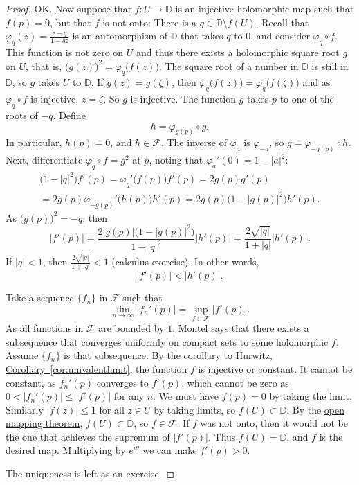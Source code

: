 \documentclass[12pt,openany]{book}
\newcommand{\sabs}[1]{\lvert {#1} \rvert}
\newcommand{\D}{{\mathbb{D}}}
\newcommand{\sF}{{\mathscr{F}}}
\theoremstyle{plain}
\theoremstyle{remark}
\theoremstyle{definition}
\theoremstyle{exercise}
\theoremstyle{example}
\newcommand{\corref}[1]{\hyperref[#1]{Corollary~\ref*{#1}}}
\begin{document}
\begin{proof}
OK\@.  Now suppose that $f \colon U \to \D$ is an injective holomorphic map
such that $f(p) = 0$, but that $f$ is not onto: There is a
$q \in \D \setminus f(U)$.
Recall that
$\varphi_q(z) = \frac{z-q}{1-\bar{q}z}$ is an automorphism of $\D$ that
takes $q$ to $0$, and consider $\varphi_q \circ f$.  This function is not
zero on $U$ and thus
there exists a holomorphic square root $g$ on $U$, that is,
${\bigl(g(z)\bigr)}^2 = \varphi_q\bigl(f(z)\bigr)$.
The square root of a number in $\D$ is still in $\D$, so $g$
takes $U$ to $\D$.
If $g(z)=g(\zeta)$, then $\varphi_q\bigl(f(z)\bigr)=\varphi_q\bigl(f(\zeta)\bigr)$ and as
$\varphi_q \circ f$ is injective, $z=\zeta$.  So $g$ is injective.  
The function $g$ takes $p$ to one of the roots of $-q$.
Define
\begin{equation*}
h = \varphi_{g(p)} \circ g .
\end{equation*}
In particular, $h(p) = 0$, and $h \in \sF$.
The inverse of $\varphi_a$ is $\varphi_{-a}$, so
$g = \varphi_{-g(p)} \circ h$.
Next, differentiate
$\varphi_q \circ f = g^2$ at $p$, noting that
$\varphi_a'(0) = 1-\sabs{a}^2$:
\begin{multline*}
\bigl(1-\sabs{q}^2\bigr) f'(p)
= \varphi_q'\bigl(f(p)\bigr) f'(p)
= 2 g(p) g'(p)
\\
= 2 g(p) \varphi_{-g(p)}'\bigl(h(p)\bigr) h'(p)
= 2 g(p) \bigl(1-\sabs{g(p)}^2\bigr) h'(p) .
\end{multline*}
As ${\bigl(g(p)\bigr)}^2 = -q$, then
\begin{equation*}
\sabs{f'(p)} =
\frac{2 \sabs{g(p)} \bigl(1-\sabs{g(p)}^2\bigr)}{1-\sabs{q}^2} \sabs{h'(p)}
=
\frac{2 \sqrt{\sabs{q}}}{1+\sabs{q}} \sabs{h'(p)} .
\end{equation*}
If $\sabs{q} < 1$, then $\frac{2 \sqrt{\sabs{q}}}{1+\sabs{q}} < 1$
(calculus exercise).
In other words,
\begin{equation*}
\sabs{f'(p)} < \sabs{h'(p)} .
\end{equation*}

Take a sequence $\{ f_n \}$ in
$\sF$ such that
\begin{equation*}
\lim_{n \to \infty} \sabs{f_n'(p)} = \sup_{f \in \sF} \sabs{f'(p)} .
\end{equation*}
As all functions in $\sF$ are bounded by $1$,
Montel says that there exists a subsequence that converges uniformly on
compact sets to some holomorphic $f$.  Assume $\{ f_n \}$ is that subsequence.
By the corollary to Hurwitz,
\corref{cor:univalentlimit},
the function $f$ is injective or constant.  It cannot be constant,
as $f_n'(p)$ converges to $f'(p)$, which
cannot be zero as  
$0 < \sabs{f_n'(p)} \leq \sabs{f'(p)}$ for any $n$.
We must have $f(p) = 0$ by taking the limit.
Similarly 
$\sabs{f(z)} \leq 1$ for all $z \in U$ by taking limits,
so $f(U) \subset \overline{\D}$.
By the \hyperref[thm:OMT]{open mapping theorem}, $f(U) \subset \D$, so $f \in
\sF$.  If $f$ was not onto, then it would not be the one that achieves the
supremum of $\sabs{f'(p)}$.  Thus $f(U) = \D$, and $f$ is the desired map.
Multiplying by $e^{i\theta}$ we can make $f'(p) > 0$.

The uniqueness is left as an exercise.
\end{proof}
\end{document}
